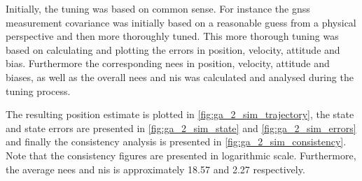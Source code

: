 Initially, the tuning was based on common sense. For instance the \acrshort{gnss} measurement covariance was initially based on a reasonable guess from a physical perspective and then more thoroughly tuned. This more thorough tuning was based on calculating and plotting the errors in position, velocity, attitude and bias. Furthermore the corresponding \acrshort{nees} in position, velocity, attitude and biases, as well as the overall \acrshort{nees} and \acrshort{nis} was calculated and analysed during the tuning process. 

The resulting position estimate is plotted in \cref{fig:ga_2_sim_trajectory}, the state and state errors are presented in \cref{fig:ga_2_sim_state} and \cref{fig:ga_2_sim_errors} and finally the consistency analysis is presented in \cref{fig:ga_2_sim_consistency}. Note that the consistency figures are presented in logarithmic scale. Furthermore, the average \acrshort{nees} and \acrshort{nis} is approximately 18.57 and 2.27 respectively.

